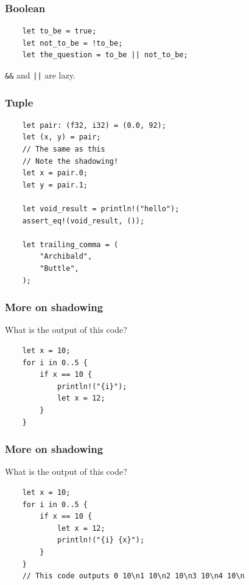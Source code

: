 \documentclass[aspectratio=1610,t]{beamer}
\begin{document}

\begin{frame}[fragile]
\frametitle{Boolean}
\begin{verbatim}
    let to_be = true;
    let not_to_be = !to_be;
    let the_question = to_be || not_to_be;
\end{verbatim}

\texttt{\&\&} and \texttt{||} are lazy.
\end{frame}


\begin{frame}[fragile]
\frametitle{Tuple}
\begin{verbatim}
    let pair: (f32, i32) = (0.0, 92);
    let (x, y) = pair;
    // The same as this
    // Note the shadowing!
    let x = pair.0;
    let y = pair.1;

    let void_result = println!("hello");
    assert_eq!(void_result, ());

    let trailing_comma = (
        "Archibald",
        "Buttle",
    );
\end{verbatim}
\end{frame}


\begin{frame}[fragile]
\frametitle{More on shadowing}
What is the output of this code?

\begin{verbatim}
    let x = 10;
    for i in 0..5 {
        if x == 10 {
            println!("{i}");
            let x = 12;
        }
    }
\end{verbatim}
\end{frame}


\begin{frame}[fragile]
\frametitle{More on shadowing}
What is the output of this code?

\begin{verbatim}
    let x = 10;
    for i in 0..5 {
        if x == 10 {
            let x = 12;
            println!("{i} {x}");
        }
    }
    // This code outputs 0 10\n1 10\n2 10\n3 10\n4 10\n
\end{verbatim}
\end{frame}
\end{document}
